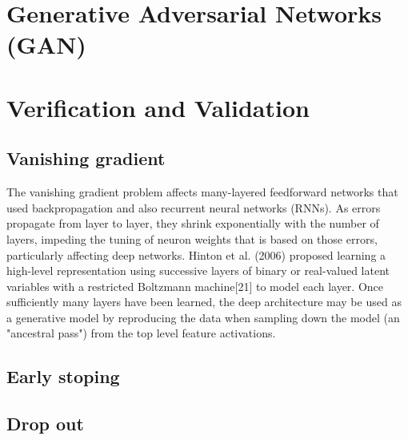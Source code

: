 \documentclass[final, paper=letter,5p,times,twocolumn]{elsarticle}
\begin{document}
\section{Generative Adversarial Networks (GAN)}

\section{Verification and Validation}

\subsection{Vanishing gradient}

The vanishing gradient problem affects many-layered feedforward networks that used backpropagation and also recurrent neural networks (RNNs). As errors propagate from layer to layer, they shrink exponentially with the number of layers, impeding the tuning of neuron weights that is based on those errors, particularly affecting deep networks. Hinton et al. (2006) proposed learning a high-level representation using successive layers of binary or real-valued latent variables with a restricted Boltzmann machine[21] to model each layer. Once sufficiently many layers have been learned, the deep architecture may be used as a generative model by reproducing the data when sampling down the model (an "ancestral pass") from the top level feature activations.\\


\subsection{Early stoping}
\subsection{Drop out}


\end{document}
